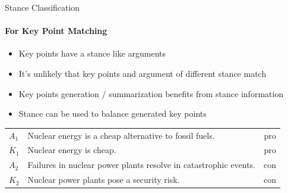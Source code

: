 \documentclass[english,handout]{mlutalk}
\begin{document}
\begin{frame}{Stance Classification}
  \framesubtitle{For Key Point Matching}
  
  \begin{itemize}
    \item Key points have a stance like arguments
    \item It's unlikely that key points and argument of different stance match
    \item Key points generation / summarization benefits from stance information~\cite{SanchanAB2017}
    \item Stance can be used to balance generated key points~\cite{ChowandaSSS2017}
  \end{itemize}

  \begin{example}
    \footnotesize\centering\vspace*{1ex}
    \begin{tabular}{llc}
      \toprule
      \(A_1\) & Nuclear energy is a cheap alternative to fossil fuels. & pro \\
      \(K_1\) & Nuclear energy is cheap. & pro \\
      \midrule
      \(A_2\) & Failures in nuclear power plants resolve in catastrophic events. & con \\
      \(K_2\) & Nuclear power plants pose a security risk. & con \\
      \bottomrule
    \end{tabular}
  \end{example}

\end{frame}
\end{document}
